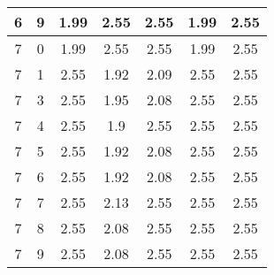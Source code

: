 \begin{longtable}{|c|c||c||c|c||c|c|}
	6 & 9 & 1.99 & 2.55 & 2.55 & 1.99 & 2.55 \\ \hline
	7 & 0 & 1.99 & 2.55 & 2.55 & 1.99 & 2.55 \\ \hline
	7 & 1 & 2.55 & 1.92 & 2.09 & 2.55 & 2.55 \\ \hline
	7 & 3 & 2.55 & 1.95 & 2.08 & 2.55 & 2.55 \\ \hline
	7 & 4 & 2.55 & 1.9 & 2.55 & 2.55 & 2.55 \\ \hline
	7 & 5 & 2.55 & 1.92 & 2.08 & 2.55 & 2.55 \\ \hline
	7 & 6 & 2.55 & 1.92 & 2.08 & 2.55 & 2.55 \\ \hline
	7 & 7 & 2.55 & 2.13 & 2.55 & 2.55 & 2.55 \\ \hline
	7 & 8 & 2.55 & 2.08 & 2.55 & 2.55 & 2.55 \\ \hline
	7 & 9 & 2.55 & 2.08 & 2.55 & 2.55 & 2.55 \\ \hline
\end{longtable}
\clearpage{}
